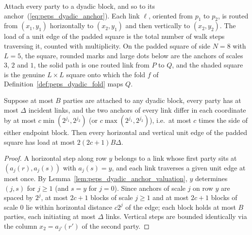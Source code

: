 \begin{definition}
    \label{def:peps_dyadic_hv_routing}
    \leanok
    Attach every party to a dyadic block, and so to its anchor~(\ref{eq:peps_dyadic_anchor}). Each link $\ell$,
    oriented from $p_1$ to $p_2$, is routed from $(x_1,y_1)$
    horizontally to $(x_2,y_1)$ and then vertically
    to $(x_2,y_2)$. The load of a unit edge of the padded square is the total number of
    walk steps traversing it, counted with multiplicity.
    On the padded square of side $N=8$ with $L=5$, the square, rounded
    marks and large dots below are the anchors of scales $3$, $2$ and $1$,
    the solid path is one routed link from $P$ to $Q$, and the shaded square is
    the genuine $L\times L$ square onto which the fold $f$ of
    Definition~\ref{def:peps_dyadic_fold} maps $Q$.
    
\end{definition}

\begin{lemma}
    \label{thm:peps_dyadic_padded_congestion}
    \leanok
    Suppose at most $B$ parties are attached to any dyadic block, every party has
    at most $\Delta$ incident links, and the two anchors of every link differ in
    each coordinate by at most $c\min(2^{j_1},2^{j_2})$ (or $c\max(2^{j_1},2^{j_2})$), i.e.\ at most $c$ times the side of either endpoint block. Then
    every horizontal and vertical unit edge of the padded square has load
    at most $2(2c+1)B\Delta$.
\end{lemma}

\begin{proof}\leanok
    A horizontal step along row $y$ belongs to a link whose first party sits at $(a_j(r),a_j(s))$ with $a_j(s)=y$, and each link traverses a given unit edge at most once. By Lemma~\ref{lem:peps_dyadic_anchor_valuation}, $y$ determines $(j,s)$ for $j\ge1$ (and $s=y$ for $j=0$). Since anchors of scale $j$ on row $y$ are spaced by $2^j$, at most $2c+1$ blocks of scale $j\ge1$ and at most $2c+1$ blocks of scale $0$ lie within horizontal distance $c2^j$ of the edge; each block holds at most $B$ parties, each initiating at most $\Delta$ links. Vertical steps are bounded identically via the column $x_2=a_{j'}(r')$ of the second party.
\end{proof}

